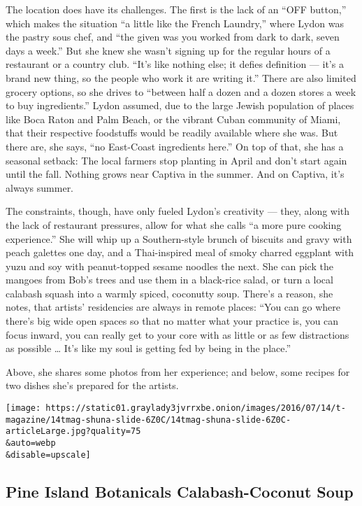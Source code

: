 The location does have its challenges. The first is the lack of an ``OFF
button,'' which makes the situation ``a little like the French
Laundry,'' where Lydon was the pastry sous chef, and ``the given was you
worked from dark to dark, seven days a week.'' But she knew she wasn't
signing up for the regular hours of a restaurant or a country club.
``It's like nothing else; it defies definition --- it's a brand new
thing, so the people who work it are writing it.'' There are also
limited grocery options, so she drives to ``between half a dozen and a
dozen stores a week to buy ingredients.'' Lydon assumed, due to the
large Jewish population of places like Boca Raton and Palm Beach, or the
vibrant Cuban community of Miami, that their respective foodstuffs would
be readily available where she was. But there are, she says, ``no
East-Coast ingredients here.'' On top of that, she has a seasonal
setback: The local farmers stop planting in April and don't start again
until the fall. Nothing grows near Captiva in the summer. And on
Captiva, it's always summer.

The constraints, though, have only fueled Lydon's creativity --- they,
along with the lack of restaurant pressures, allow for what she calls
``a more pure cooking experience.'' She will whip up a Southern-style
brunch of biscuits and gravy with peach galettes one day, and a
Thai-inspired meal of smoky charred eggplant with yuzu and soy with
peanut-topped sesame noodles the next. She can pick the mangoes from
Bob's trees and use them in a black-rice salad, or turn a local calabash
squash into a warmly spiced, coconutty soup. There's a reason, she
notes, that artists' residencies are always in remote places: ``You can
go where there's big wide open spaces so that no matter what your
practice is, you can focus inward, you can really get to your core with
as little or as few distractions as possible \ldots{} It's like my soul
is getting fed by being in the place.''

Above, she shares some photos from her experience; and below, some
recipes for two dishes she's prepared for the artists.

\texttt{[image: https://static01.graylady3jvrrxbe.onion/images/2016/07/14/t-magazine/14tmag-shuna-slide-6Z0C/14tmag-shuna-slide-6Z0C-articleLarge.jpg?quality=75\\\&auto=webp\\\&disable=upscale]}

\hypertarget{pine-island-botanicals-calabash-coconut-soup}{%
\subsection{Pine Island Botanicals Calabash-Coconut
Soup}\label{pine-island-botanicals-calabash-coconut-soup}}

